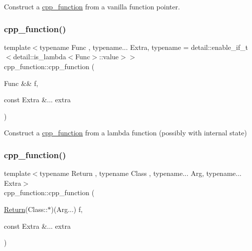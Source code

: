 Construct a \mbox{\hyperlink{classcpp__function}{cpp\+\_\+function}} from a vanilla function pointer. 

\mbox{\label{classcpp__function_a345da213151996cb60ba487622036899}} 
\subsubsection{\texorpdfstring{cpp\_function()}{cpp\_function()}\hspace{0.1cm}{\footnotesize\ttfamily [4/6]}}
{\footnotesize\ttfamily template$<$typename Func , typename... Extra, typename  = detail\+::enable\+\_\+if\+\_\+t$<$detail\+::is\+\_\+lambda$<$\+Func$>$\+::value$>$$>$ \\
cpp\+\_\+function\+::cpp\+\_\+function (\begin{DoxyParamCaption}\item[{Func \&\&}]{f,  }\item[{const Extra \&...}]{extra }\end{DoxyParamCaption})\hspace{0.3cm}{\ttfamily [inline]}}



Construct a \mbox{\hyperlink{classcpp__function}{cpp\+\_\+function}} from a lambda function (possibly with internal state) 

\mbox{\label{classcpp__function_a977ae047c5ece21dbfbbccda8c304986}} 
\subsubsection{\texorpdfstring{cpp\_function()}{cpp\_function()}\hspace{0.1cm}{\footnotesize\ttfamily [5/6]}}
{\footnotesize\ttfamily template$<$typename Return , typename Class , typename... Arg, typename... Extra$>$ \\
cpp\+\_\+function\+::cpp\+\_\+function (\begin{DoxyParamCaption}\item[{\mbox{\hyperlink{_python-ast_8h_abdae7f49d66ce8e500825bb53aa14901}{Return}}(Class\+::$\ast$)(Arg...)}]{f,  }\item[{const Extra \&...}]{extra }\end{DoxyParamCaption})\hspace{0.3cm}{\ttfamily [inline]}}



